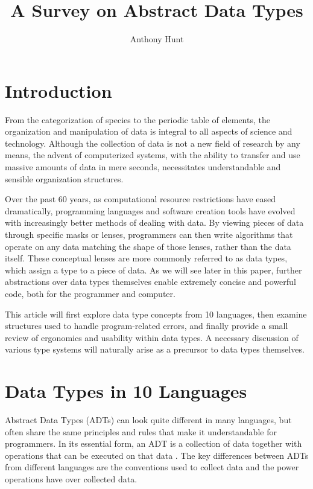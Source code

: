 \documentclass{article}
\title{A Survey on Abstract Data Types}
\author{Anthony Hunt}
\begin{document}
\maketitle
\tableofcontents

\section{Introduction}

From the categorization of species to the periodic table of elements, the organization and manipulation
of data is integral to all aspects of science and technology. Although the collection of data is not a
new field of research by any means, the advent of computerized systems, with the ability to transfer and use
massive amounts of data in mere seconds, necessitates understandable and sensible organization structures.

Over the past 60 years, as computational resource restrictions have eased dramatically,
programming languages and software creation tools have evolved with increasingly better methods of dealing with data.
By viewing pieces of data through specific masks or lenses, programmers can then write algorithms that operate on
any data matching the shape of those lenses, rather than the data itself. These conceptual lenses are more commonly referred to as
data types, which assign a type to a piece of data. As we will see later in this paper,
further abstractions over data types themselves enable extremely concise and powerful code,
both for the programmer and computer.

This article will first explore data type concepts from 10 languages,
then examine structures used to handle program-related errors, and finally provide a small review of ergonomics and usability within data types.
A necessary discussion of various type systems will naturally arise as a precursor to data types themselves.

\section{Data Types in 10 Languages}

Abstract Data Types (ADTs) can look quite different in many languages, but often share the same principles and rules
that make it understandable for programmers. In its essential form, an ADT is a collection of data together with
operations that can be executed on that data \cite{ADTspec}. The key differences between ADTs from different languages
are the conventions used to collect data and the power operations have over collected data.
\end{document}

